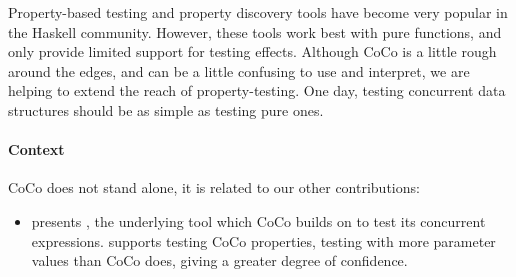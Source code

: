 Property-based testing and property discovery tools have become very
popular in the Haskell community.  However, these tools work best with
pure functions, and only provide limited support for testing effects.
Although CoCo is a little rough around the edges, and can be a little
confusing to use and interpret, we are helping to extend the reach of
property-testing.  One day, testing concurrent data structures should
be as simple as testing pure ones.

\paragraph{Context}
CoCo does not stand alone, it is related to our other contributions:

\begin{itemize}
\item {} presents \dejafu{}, the underlying tool which
  CoCo builds on to test its concurrent expressions.  \dejafu{}
  supports testing CoCo properties, testing with more parameter values
  than CoCo does, giving a greater degree of confidence.
\end{itemize}


